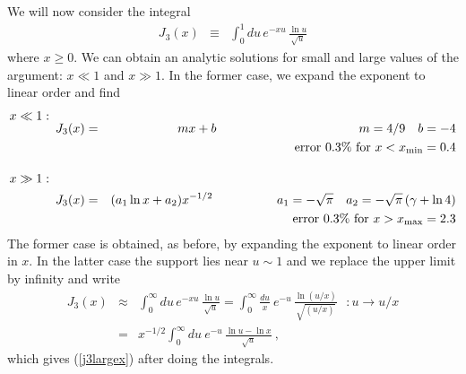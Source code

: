 \documentclass[preprint,12pt,eqsecnum,nofootinbib,amsmath,amssymb]{revtex4}
\begin{document}
We will now consider the integral
\begin{eqnarray}
  J_3(x) &\equiv& 
  \int_0^1 du\,e^{-x u} \, \frac{\ln u}
  {\sqrt{u}} 
\end{eqnarray}
where $x \ge 0$. We can obtain an analytic solutions for small and large 
values of the argument: $x \ll 1$ and $x \gg 1$. In the former case, we 
expand the exponent to linear order and find
\begin{eqnarray}
\nonumber
  x \ll 1: \hskip1cm &&
\\[-5pt]
  J_3(x) &=& m x + b 
  \hskip4cm m= 4/9 ~~~ b=-4  
\\\nonumber &&
  \hskip-1.3cm {\rm error~} 0.3\% {\rm ~for~} x< x_{\rm min}=0.4
\\[10pt]
\nonumber
  x \gg 1: \hskip1cm &&
\\
\label{j3largex}
  J_3(x) &=& (a_1 \ln x + a_2) x^{-1/2} 
  \hskip1.8cm a_1 = -\sqrt{\pi} ~~~ 
  a_2 =  -\sqrt{\pi}\,(\gamma + \ln4)
\\\nonumber &&
  \hskip-1.3cm {\rm error~} 0.3\% {\rm ~for~} x> x_{\rm max}=2.3
\end{eqnarray}
The former case is obtained, as before, by expanding the
exponent to linear order in $x$. In the latter case the support 
lies near $u \sim 1$ and we replace the upper limit by infinity 
and write
\begin{eqnarray}
\nonumber
  J_3(x) 
  &\approx&
  \int_0^\infty  du\,e^{-x u} \, \frac{\ln u}{\sqrt{u}} 
  =
  \int_0^\infty  \frac{du}{x} ~ e^{-u} \, \frac{\ln (u/x)}
  {\sqrt{(u/x)}} ~~~ : u \to u/x
\\[5pt]
  &=&
  x^{-1/2}\int_0^\infty  du ~ e^{-u} \, 
  \frac{\ln u  - \ln x}{\sqrt{u}} \ ,
\end{eqnarray}
which gives (\ref{j3largex}) after doing the integrals.
\end{document}
